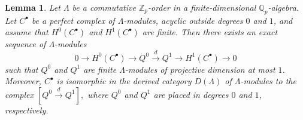 \documentclass[a4paper,11pt]{article}
\newtheorem{lemma}[theorem]{Lemma}
\begin{document}
\begin{lemma}
\label{lem:Greither-perfect-finite-order}
Let \(\Lambda\) be a commutative \(\mathbb Z_p\)-order in a finite-dimensional
\(\mathbb Q_p\)-algebra. Let \(C^{\bullet}\) be a perfect complex of
\(\Lambda\)-modules, acyclic outside degrees \(0\) and \(1\), and assume that
\(H^0(C^{\bullet})\) and \(H^1(C^{\bullet})\) are finite. Then there exists an
exact sequence of \(\Lambda\)-modules
\[
0
\longrightarrow
H^0(C^{\bullet})
\longrightarrow
Q^0
\stackrel{d}{\longrightarrow}
Q^1
\longrightarrow
H^1(C^{\bullet})
\longrightarrow
0
\]
such that \(Q^0\) and \(Q^1\) are finite \(\Lambda\)-modules of projective
dimension at most \(1\). Moreover, \(C^{\bullet}\) is isomorphic in the derived category
\(D(\Lambda)\) of \(\Lambda\)-modules to the complex
\(
[Q^0
\stackrel{d}{\longrightarrow}
Q^1],
\)
where \(Q^0\) and \(Q^1\) are placed in degrees \(0\) and \(1\), respectively.
\end{lemma}
\end{document}

